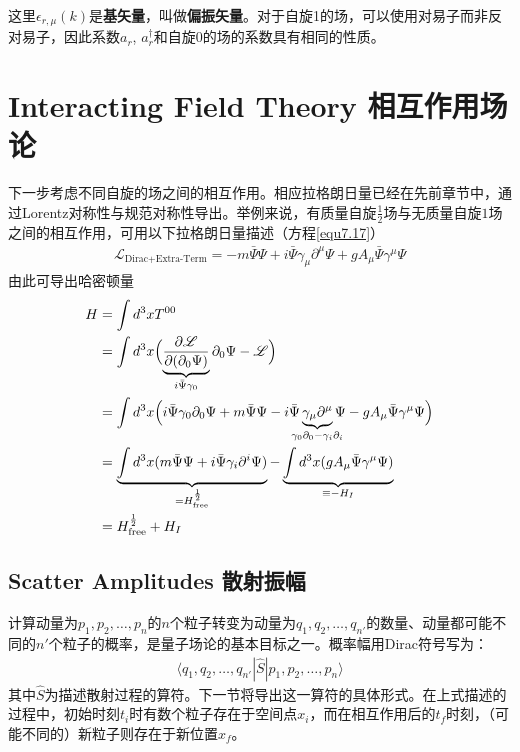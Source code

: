 这里$\epsilon_{r,\mu}(k)$是{\bf 基矢量}，叫做{\bf 偏振矢量}。对于自旋1的场，可以使用对易子而非反对易子，因此系数$a_{r}$, $a_{r}^{\dagger}$和自旋$0$的场的系数具有相同的性质。

\section[相互作用场论]{Interacting Field Theory \quad 相互作用场论}\label{sec9.5}
下一步考虑不同自旋的场之间的相互作用。相应拉格朗日量已经在先前章节中，通过Lorentz对称性与规范对称性导出。举例来说，有质量自旋$\frac{1}{2}$场与无质量自旋$1$场之间的相互作用，可用以下拉格朗日量描述（方程\eqref{equ7.17}）
\begin{align}\label{equ9.45}
\mathscr{L}_\text{Dirac+Extra-Term}=-m\bar{\Psi}\Psi+i\bar{\Psi}\gamma_\mu\partial^\mu\Psi+gA_\mu\bar{\Psi}\gamma^\mu\Psi
\end{align}
由此可导出哈密顿量
\begin{align}
H&=\int{d^3x T^{00}}\nonumber\\
&=\int{d^3x\Bigl(\underbrace{\frac{\partial\mathscr{L}}{\partial(\partial_0\Psi)} }_{i\bar{\Psi}\gamma_0}\partial_0\Psi-\mathscr{L} \Bigl)}\nonumber\\
&=\int d^3x\Bigl( i\bar{\Psi}\gamma_0\partial_0\Psi+m\bar{\Psi}\Psi-i\bar{\Psi}\underbrace{\gamma_\mu\partial^\mu}_{\mathclap{\gamma_0\partial_0-\gamma_i\partial_i}}\Psi-gA_\mu\bar{\Psi}\gamma^\mu\Psi \Bigl)\nonumber\\
&=\underbrace{\int d^3x( m\bar{\Psi}\Psi+i\bar{\Psi}\gamma_i\partial^i\Psi)}_{=H^{\frac{1}{2}}_\text{free}}- \underbrace{\int d^3x (gA_\mu\bar{\Psi}\gamma^\mu\Psi )}_{\equiv-H_I}\nonumber\\
&=H_\text{free}^{\frac{1}{2}}+H_I \label{equ9.46}
\end{align}

\subsection[散射振幅]{Scatter Amplitudes \quad 散射振幅}\label{sec9.5.1}
计算动量为$p_1,p_2,\ldots,p_n$的$n$个粒子转变为动量为$q_1,q_2,\ldots,q_{n'}$的数量、动量都可能不同的$n'$个粒子的概率，是量子场论的基本目标之一。概率幅用Dirac符号写为：
\begin{align}\label{equ9.47}
\langle q_1,q_2,\ldots,q_{n'}|\hat{S}|p_1,p_2,\ldots,p_n\rangle
\end{align}
其中$\hat{S}$为描述散射过程的算符。下一节将导出这一算符的具体形式。在上式描述的过程中，初始时刻$t_i$时有数个粒子存在于空间点$x_i$，而在相互作用后的$t_f$时刻，（可能不同的）新粒子则存在于新位置$x_f$。

